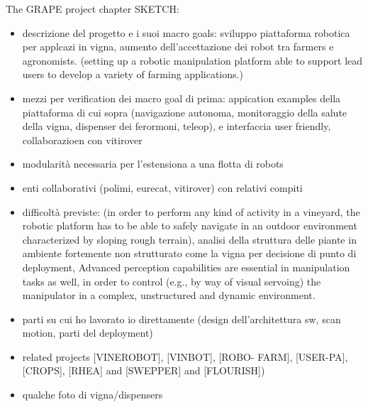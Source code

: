\hrulefill


The GRAPE project chapter SKETCH:
\begin{itemize}
	\item descrizione del progetto e i suoi macro goals: sviluppo piattaforma robotica per applcazi in vigna, aumento dell'accettazione dei robot tra farmers e agronomists. (setting up a robotic manipulation platform able to support lead users to
develop a variety of farming applications.)
	\item mezzi per verification dei macro goal di prima: appication examples della piattaforma di cui sopra  (navigazione autonoma, monitoraggio  della salute della vigna, dispenser dei ferormoni, teleop), e  interfaccia user friendly, collaborazioen con vitirover
	\item modularità necessaria per l'estensiona a una flotta di robots
	\item enti collaborativi (polimi, eurecat, vitirover) con relativi compiti
	\item difficoltà previste: (in order to perform any kind of activity
in a vineyard, the robotic platform has to be able to safely navigate in an outdoor environment characterized by sloping rough terrain), analisi della struttura delle piante in ambiente fortemente non strutturato come la vigna per decisione di punto di deployment, Advanced perception capabilities are essential in manipulation tasks as well, in order to control (e.g.,
by way of visual servoing) the manipulator in a complex, unstructured and dynamic environment.
	\item parti su cui ho lavorato io direttamente (design dell'architettura sw, scan motion, parti del deployment)
	\item related projects [VINEROBOT], [VINBOT], [ROBO-
FARM], [USER-PA], [CROPS], [RHEA] and [SWEPPER] and [FLOURISH])
	\item qualche foto di vigna/dispensers
\end{itemize}

